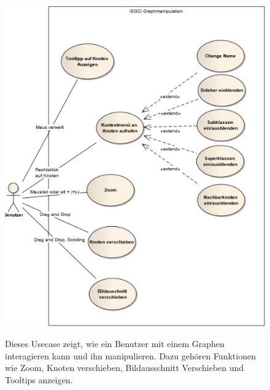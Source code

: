 \documentclass[11pt,a4paper]{article}
\begin{document}
\begin{figure}[htp]
	\begin{center}
		\includegraphics[width=13cm]{Graphmanipulation.PNG}\\
	\end{center}
	\caption{Dieses Usecase zeigt, wie ein Benutzer mit einem Graphen interagieren kann und ihn manipulieren. Dazu gehören Funktionen wie Zoom, Knoten verschieben, Bildausschnitt Verschieben und Tooltips anzeigen.}
	\label{fig:figure1}
\end{figure}
\end{document}
